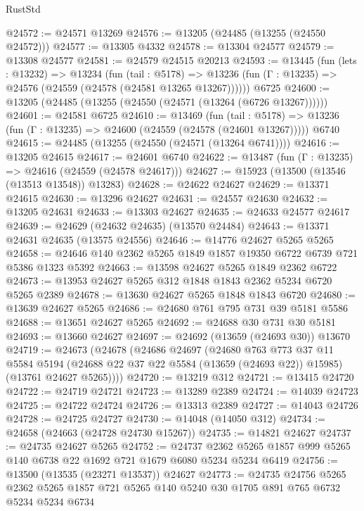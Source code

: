 \begin{lexlean}{RustStd}
\begin{coremodule}
@24572 := @24571 @13269
@24576 := @13205 (@24485 (@13255 (@24550 @24572)))
@24577 := @13305 @4332
@24578 := @13304 @24577
@24579 := @13308 @24577
@24581 := @24579 @24515 @20213
@24593 := @13445
    (fun (lets : @13232) =>
    @13234
      (fun (tail : @5178) =>
      @13236 (fun (Γ : @13235) => @24576 (@24559 (@24578 (@24581 @13265 @13267))))))
    @6725
@24600 := @13205 (@24485 (@13255 (@24550 (@24571 (@13264 (@6726 @13267))))))
@24601 := @24581 @6725
@24610 := @13469
    (fun (tail : @5178) => @13236 (fun (Γ : @13235) => @24600 (@24559 (@24578 (@24601 @13267)))))
    @6740
@24615 := @24485 (@13255 (@24550 (@24571 (@13264 @6741))))
@24616 := @13205 @24615
@24617 := @24601 @6740
@24622 := @13487 (fun (Γ : @13235) => @24616 (@24559 (@24578 @24617)))
@24627 := @15923 (@13500 (@13546 (@13513 @13548)) @13283)
@24628 := @24622 @24627
@24629 := @13371 @24615
@24630 := @13296 @24627
@24631 := @24557 @24630
@24632 := @13205 @24631
@24633 := @13303 @24627
@24635 := @24633 @24577 @24617
@24639 := @24629 (@24632 @24635) (@13570 @24484)
@24643 := @13371 @24631 @24635 (@13575 @24556)
@24646 := @14776 @24627 @5265 @5265
@24658 := @24646 @140 @2362 @5265 @1849 @1857 @19350 @6722 @6739 @721 @5386 @1323 @5392
@24663 := @13598 @24627 @5265 @1849 @2362 @6722
@24673 := @13953 @24627 @5265 @312 @1848 @1843 @2362 @5234 @6720 @5265 @2389
@24678 := @13630 @24627 @5265 @1848 @1843 @6720
@24680 := @13639 @24627 @5265
@24686 := @24680 @761 @795 @731 @39 @5181 @5586
@24688 := @13651 @24627 @5265
@24692 := @24688 @30 @731 @30 @5181
@24693 := @13660 @24627
@24697 := @24692 (@13659 (@24693 @30)) @13670
@24719 := @24673
    (@24678
      (@24686
        @24697
        (@24680
          @763
          @773
          @37
          @11
          @5584
          @5194
          (@24688 @22 @37 @22 @5584 (@13659 (@24693 @22)) @15985)
          (@13761 @24627 @5265))))
@24720 := @13219 @312
@24721 := @13415 @24720
@24722 := @24719 @24721
@24723 := @13289 @2389
@24724 := @14039 @24723
@24725 := @24722 @24724
@24726 := @13313 @2389
@24727 := @14043 @24726
@24728 := @24725 @24727
@24730 := @14048 (@14050 @312)
@24734 := @24658 (@24663 (@24728 @24730 @15267))
@24735 := @14821 @24627
@24737 := @24735 @24627 @5265
@24752 := @24737
    @2362
    @5265
    @1857
    @999
    @5265
    @140
    @6738
    @22
    @1692
    @721
    @1679
    @6080
    @5234
    @5234
    @6419
@24756 := @13500 (@13535 (@23271 @13537)) @24627
@24773 := @24735
    @24756
    @5265
    @2362
    @5265
    @1857
    @721
    @5265
    @140
    @5240
    @30
    @1705
    @891
    @765
    @6732
    @5234
    @5234
    @6734

\end{coremodule}
\end{lexlean}
